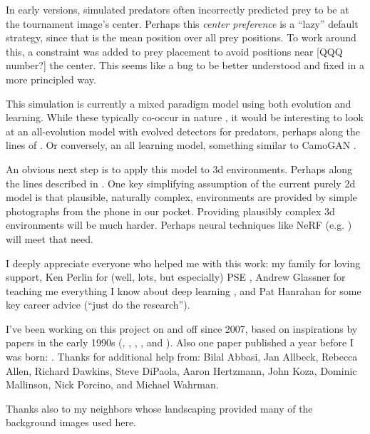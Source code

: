 \documentclass[acmtog]{acmart}
\newcommand{\jargon}[1]{\textit{#1}}
\begin{document}
\par
In early versions, simulated predators often incorrectly predicted prey to be at the tournament image's center. Perhaps this \jargon{center preference} is a “lazy” default strategy, since that is the mean position over all prey positions. To work around this, a constraint was added to prey placement to avoid positions near [QQQ number?] the center. This seems like a bug to be better understood and fixed in a more principled way.
\par
This simulation is currently a mixed paradigm model using both evolution and learning. While these typically co-occur in nature \cite{valiant_probably_2013}, it would be interesting to look at an all-evolution model with evolved detectors for predators, perhaps along the lines of \citet{bi_genetic_2022}. Or conversely, an all learning model, something similar to CamoGAN \cite{talas_camogan_2020}.
\par
An obvious next step is to apply this model to 3d environments. Perhaps along the lines described in \citet{miller_color_2022}. One key simplifying assumption of the current purely 2d model is that plausible, naturally complex, environments are provided by simple photographs from the phone in our pocket. Providing plausibly complex 3d environments will be much harder. Perhaps neural techniques like NeRF (e.g. \cite{gao_nerf_2022}) will meet that need.
\par


\begin{acks}
I deeply appreciate everyone who helped me with this work: my family for loving support, Ken Perlin for (well, lots, but especially) PSE \cite{perlin_image_1985}, Andrew Glassner for teaching me everything I know about deep learning \cite{glassner_deep_2021}, and Pat Hanrahan for some key career advice (“just do the research”).
\par
I've been working on this project on and off since 2007, based on inspirations by papers in the early 1990s (\citet{witkin_reaction_1991}, \citet{turk_generating_1991}, \citet{angeline_competitive_1993}, \citet{sims_artificial_1991}, and \citet{sims_evolving_1994}). Also one paper published a year before I was born: \citet{turing_chemical_1952}.
Thanks for additional help from:
Bilal Abbasi,
Jan Allbeck,
Rebecca Allen,
Richard Dawkins,
Steve DiPaola,
Aaron Hertzmann,
John Koza,
Dominic Mallinson,
Nick Porcino,
and Michael Wahrman.
\par
Thanks also to my neighbors whose landscaping provided many of the background images used here.
\par
\end{acks}
\end{document}
